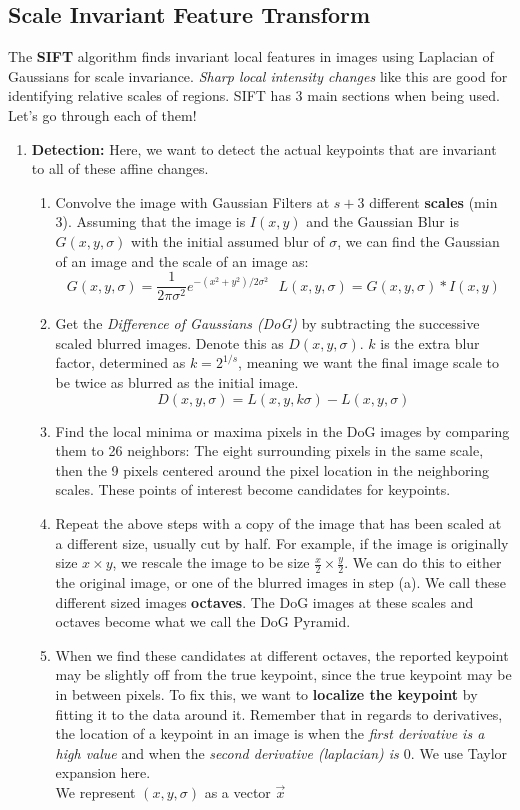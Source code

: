\documentclass{article}
\begin{document}
\subsection{Scale Invariant Feature Transform}
The \textbf{SIFT} algorithm finds invariant local features in images using Laplacian of Gaussians for scale invariance. \textit{Sharp local intensity changes} like this are good for identifying relative scales of regions. SIFT has 3 main sections when being used. Let's go through each of them!
\begin{enumerate}
    \item \textbf{Detection:} Here, we want to detect the actual keypoints that are invariant to all of these affine changes. 
    \begin{enumerate}
        \item Convolve the image with Gaussian Filters at $s+3$ different \textbf{scales} (min 3). Assuming that the image is $I(x,y)$ and the Gaussian Blur is $G(x,y,\sigma)$ with the initial assumed blur of $\sigma$, we can find the Gaussian of an image and the scale of an image as:
        $$G(x,y,\sigma) = \frac{1}{2\pi\sigma^2}e^{-(x^2+y^2)/2\sigma^2}\text{     }L(x,y,\sigma) = G(x,y,\sigma) * I(x,y)$$
        \item Get the \textit{Difference of Gaussians (DoG)} by subtracting the successive scaled blurred images. Denote this as $D(x,y,\sigma)$. $k$ is the extra blur factor, determined as $k = 2^{1/s}$, meaning we want the final image scale to be twice as blurred as the initial image. 
        $$D(x,y,\sigma) = L(x,y,k\sigma) - L(x,y,\sigma)$$
        \item Find the local minima or maxima pixels in the DoG images by comparing them to 26 neighbors: The eight surrounding pixels in the same scale, then the 9 pixels centered around the pixel location in the neighboring scales. These points of interest become candidates for keypoints.
        \item Repeat the above steps with a copy of the image that has been scaled at a different size, usually cut by half. For example, if the image is originally size $x\times y$, we rescale the image to be size $\frac{x}{2} \times \frac{y}{2}$. We can do this to either the original image, or one of the blurred images in step (a). We call these different sized images \textbf{octaves}. The DoG images at these scales and octaves become what we call the DoG Pyramid. 
        \item When we find these candidates at different octaves, the reported keypoint may be slightly off from the true keypoint, since the true keypoint may be in between pixels. To fix this, we want to \textbf{localize the keypoint} by fitting it to the data around it. Remember that in regards to derivatives, the location of a keypoint in an image is when the \textit{first derivative is a high value} and when the \textit{second derivative (laplacian) is $0$}. We use Taylor expansion here.\\We represent $(x,y,\sigma)$ as a vector $\vec{x}$

\end{enumerate}
\end{enumerate}
\end{document}
